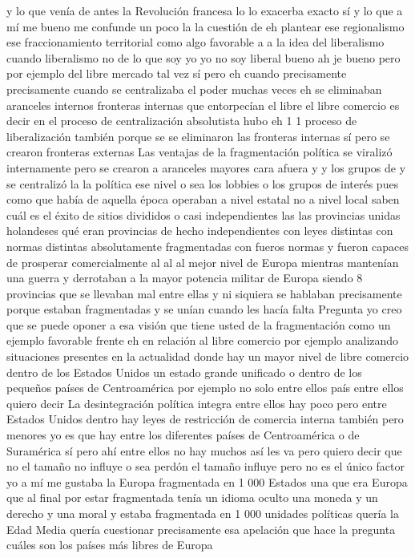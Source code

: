 y lo que venía de antes la Revolución francesa lo lo exacerba exacto sí y lo que a mí me bueno
me confunde un poco la la cuestión de eh plantear ese regionalismo ese fraccionamiento territorial
como algo favorable a a la idea del liberalismo cuando liberalismo no de lo que soy yo
yo no soy liberal bueno ah je bueno pero por ejemplo del libre mercado tal vez sí
pero eh cuando precisamente precisamente cuando se centralizaba el poder muchas veces eh
se eliminaban aranceles internos fronteras internas que entorpecían el libre el libre comercio
es decir en el proceso de centralización absolutista hubo eh 1 1 proceso de liberalización también
porque se se eliminaron las fronteras internas sí pero se crearon fronteras externas
Las ventajas de la fragmentación política
se viralizó internamente pero se crearon a aranceles mayores cara afuera y y los grupos de y se centralizó la la política
ese nivel o sea los lobbies o los grupos de interés pues como que había de aquella época operaban a nivel estatal no a nivel local
saben cuál es el éxito de sitios divididos o casi independientes las las provincias unidas holandeses
qué eran provincias de hecho independientes con leyes distintas con normas distintas
absolutamente fragmentadas con fueros normas y fueron capaces de prosperar comercialmente al al al mejor nivel de Europa
mientras mantenían una guerra y derrotaban a la mayor potencia militar de Europa siendo 8 provincias que se llevaban mal entre ellas
y ni siquiera se hablaban precisamente porque estaban fragmentadas y se unían cuando les hacía falta
Pregunta
yo creo que se puede oponer a esa visión que tiene usted de la fragmentación como
un ejemplo favorable frente eh en relación al libre comercio por ejemplo analizando situaciones presentes en la actualidad
donde hay un mayor nivel de libre comercio dentro de los Estados Unidos un estado grande unificado o dentro de los pequeños países de Centroamérica
por ejemplo no solo entre ellos país entre ellos quiero decir
La desintegración política integra
entre ellos hay poco pero entre Estados Unidos dentro hay leyes de restricción de comercia interna también
pero menores yo es que hay entre los diferentes países de Centroamérica o de Suramérica sí
pero ahí entre ellos no hay muchos así les va pero quiero decir que no
el tamaño no influye o sea perdón el tamaño influye pero no es el único factor
yo a mí me gustaba la Europa fragmentada en 1 000 Estados una que era Europa que al final por estar fragmentada tenía un idioma oculto
una moneda y un derecho y una moral y estaba fragmentada en 1 000 unidades políticas
quería la Edad Media quería cuestionar precisamente esa apelación que hace la pregunta cuáles son los países más libres de Europa
